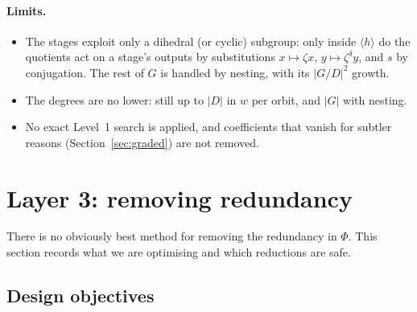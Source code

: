 \documentclass[11pt]{article}
\theoremstyle{definition}
\theoremstyle{remark}
\begin{document}
\paragraph{Limits.}
\begin{itemize}
  \item The stages exploit only a dihedral (or cyclic) subgroup: only inside
    $\langle h\rangle$ do the quotients act on a stage's outputs by
    substitutions $x \mapsto \zeta x$, $y \mapsto \zeta^\delta y$, and $s$ by
    conjugation. The rest of $G$ is handled by nesting, with its $|G/D|^2$
    growth.
  \item The degrees are no lower: still up to $|D|$ in $w$ per orbit, and $|G|$
    with nesting.
  \item No exact Level~1 search is applied, and coefficients that vanish for
    subtler reasons (Section~\ref{sec:graded}) are not removed.
\end{itemize}

\section{Layer 3: removing redundancy}

There is no obviously best method for removing the redundancy in $\Phi$.
This section records what we are optimising and which reductions are safe.

\subsection{Design objectives}
\end{document}

